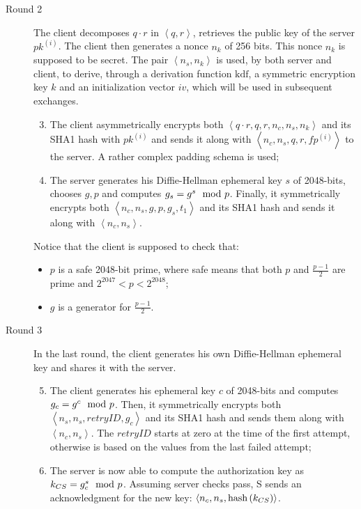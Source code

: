 \begin{description}
    \item[Round 2] The client decomposes $q\cdot r$ in $\left<q, r\right>$, retrieves the public key of the server $pk^{\left(i\right)}$. The client then generates a nonce $n_k$ of 256 bits. This nonce $n_k$ is supposed to be secret. The pair $\left<n_s, n_k\right>$ is used, by both server and client, to derive, through a derivation function $\mbox{kdf}$, a symmetric encryption key $k$ and an initialization vector $iv$, which will be used in subsequent exchanges.
    \begin{enumerate}
        \setcounter{enumi}{2}
        \item{The client asymmetrically encrypts both $\left<q\cdot r, q, r, n_c, n_s, n_k\right>$ and its SHA1 hash with $pk^{(i)}$ and sends it along with $\left<n_c, n_s, q, r, fp^{(i)}\right>$ to the server. A rather complex padding schema is used;}
        \item{The server generates his Diffie-Hellman ephemeral key $s$ of 2048-bits, chooses $g, p$ and computes $g_s = g^s \mod{p}$. Finally, it symmetrically encrypts both $\left<n_c, n_s, g, p, g_s, t_1\right>$ and its SHA1 hash and sends it along with $\left<n_c, n_s\right>$.}
    \end{enumerate}

    Notice that the client is supposed to check that:
    \begin{itemize}
        \label{item:DH-clients-checks}
        \item{$p$ is a safe 2048-bit prime, where safe means that both $p$ and $\frac{p-1}{2}$ are prime and $2^{2047} < p < 2^{2048}$;}
        \item{$g$ is a generator for $\frac{p-1}{2}$.}
    \end{itemize}

    \item[Round 3] In the last round, the client generates his own Diffie-Hellman ephemeral key and shares it with the server.
    \begin{enumerate}
        \setcounter{enumi}{4}
        \item{The client generates his ephemeral key $c$ of 2048-bits and computes $g_c = g^c \mod{p}$. Then, it symmetrically encrypts both $\left<n_s, n_s, retryID, g_c\right>$ and its SHA1 hash and sends them along with $\left<n_c, n_s\right>$. The $retryID$ starts at zero at the time of the first attempt, otherwise is based on the values from the last failed attempt;}
        \item{The server is now able to compute the authorization key as $k_{CS} = g_c^s \mod{p}$. Assuming server checks pass, S sends an acknowledgment for the new key: $\left<n_c, n_s, \mbox{hash}\left(k_{CS}\right)\right>$.}
    \end{enumerate}

\end{description}


